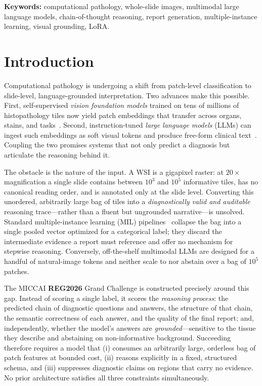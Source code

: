 \documentclass[11pt]{article}
\begin{document}
\noindent\textbf{Keywords:} computational pathology, whole-slide images,
multimodal large language models, chain-of-thought reasoning, report generation,
multiple-instance learning, visual grounding, LoRA.

\section{Introduction}
Computational pathology is undergoing a shift from patch-level classification to
slide-level, language-grounded interpretation. Two advances make this possible.
First, self-supervised \emph{vision foundation models} trained on tens of
millions of histopathology tiles now yield patch embeddings that transfer across
organs, stains, and tasks~\cite{chen2024uni,lu2024conch}. Second,
instruction-tuned \emph{large language models} (LLMs) can ingest such embeddings
as soft visual tokens and produce free-form clinical
text~\cite{alayrac2022flamingo,li2023blip2,liu2023llava}. Coupling the two
promises systems that not only predict a diagnosis but articulate the reasoning
behind it.

The obstacle is the nature of the input. A WSI is a gigapixel raster: at
$20\times$ magnification a single slide contains between $10^3$ and $10^5$
informative tiles, has no canonical reading order, and is annotated only at the
slide level. Converting this unordered, arbitrarily large bag of tiles into a
\emph{diagnostically valid and auditable} reasoning trace---rather than a fluent
but ungrounded narrative---is unsolved. Standard multiple-instance learning (MIL)
pipelines~\cite{ilse2018attention,lu2021clam} collapse the bag into a single
pooled vector optimized for a categorical label; they discard the intermediate
evidence a report must reference and offer no mechanism for stepwise reasoning.
Conversely, off-the-shelf multimodal LLMs are designed for a handful of
natural-image tokens and neither scale to nor abstain over a bag of $10^5$
patches.

The MICCAI \textbf{REG2026} Grand Challenge is constructed precisely around this
gap. Instead of scoring a single label, it scores the \emph{reasoning process}:
the predicted chain of diagnostic questions and answers, the structure of that
chain, the semantic correctness of each answer, and the quality of the final
report; and, independently, whether the model's answers are
\emph{grounded}---sensitive to the tissue they describe and abstaining on
non-informative background. Succeeding therefore requires a model that (i)
consumes an arbitrarily large, orderless bag of patch features at bounded cost,
(ii) reasons explicitly in a fixed, structured schema, and (iii)
suppresses diagnostic claims on regions that carry no evidence. No prior
architecture satisfies all three constraints simultaneously.
\end{document}
